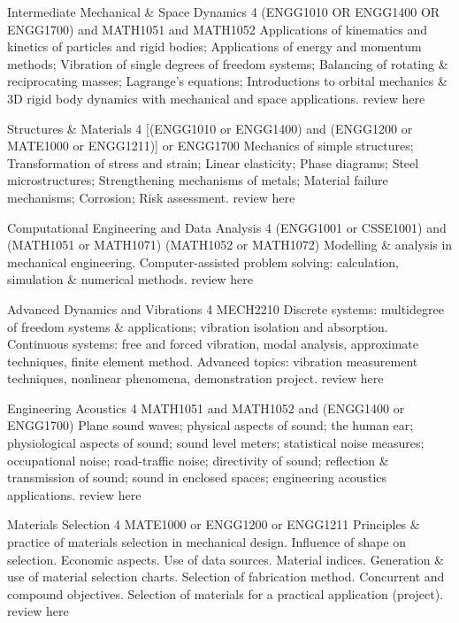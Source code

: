 	{Intermediate Mechanical \& Space Dynamics}
	{4}
	{(ENGG1010 OR ENGG1400 OR ENGG1700) and MATH1051 and MATH1052}
	{}
	{}
	{Applications of kinematics and kinetics of particles and rigid bodies; Applications of energy and momentum methods; Vibration of single degrees of freedom systems; Balancing of rotating \& reciprocating masses; Lagrange's equations; Introductions to orbital mechanics \& 3D rigid body dynamics with mechanical and space applications.}
	{review here}

	{Structures \& Materials}
	{4}
	{[(ENGG1010 or ENGG1400) and (ENGG1200 or MATE1000 or ENGG1211)] or ENGG1700}
	{}
	{}
	{Mechanics of simple structures; Transformation of stress and strain; Linear elasticity; Phase diagrams; Steel microstructures; Strengthening mechanisms of metals; Material failure mechanisms; Corrosion; Risk assessment.}
	{review here}

	{Computational Engineering and Data Analysis}
	{4}
	{(ENGG1001 or CSSE1001) and (MATH1051 or MATH1071)}
	{(MATH1052 or MATH1072)}
	{}
	{Modelling \& analysis in mechanical engineering. Computer-assisted problem solving: calculation, simulation \& numerical methods.}
	{review here}

	{Advanced Dynamics and Vibrations}
	{4}
	{MECH2210}
	{}
	{}
	{Discrete systems: multidegree of freedom systems \& applications; vibration isolation and absorption. Continuous systems: free and forced vibration, modal analysis, approximate techniques, finite element method. Advanced topics: vibration measurement techniques, nonlinear phenomena, demonstration project.}
	{review here}

	{Engineering Acoustics}
	{4}
	{MATH1051 and MATH1052 and (ENGG1400 or ENGG1700)}
	{}
	{}
	{Plane sound waves; physical aspects of sound; the human ear; physiological aspects of sound; sound level meters; statistical noise measures; occupational noise; road-traffic noise; directivity of sound; reflection \& transmission of sound; sound in enclosed spaces; engineering acoustics applications.}
	{review here}

	{Materials Selection}
	{4}
	{MATE1000 or ENGG1200 or ENGG1211}
	{}
	{}
	{Principles \& practice of materials selection in mechanical design. Influence of shape on selection. Economic aspects. Use of data sources. Material indices. Generation \& use of material selection charts. Selection of fabrication method. Concurrent and compound objectives. Selection of materials for a practical application (project).}
	{review here}

